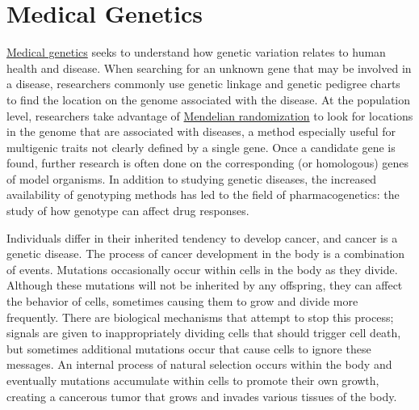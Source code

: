 \hypertarget{medical-genetics}{%
\section{Medical Genetics}\label{medical-genetics}}

\href{https://en.wikipedia.org/wiki/Medical_genetics}{Medical genetics} seeks to understand how genetic variation relates to human health and disease. When searching for an unknown gene that may be involved in a disease, researchers commonly use genetic linkage and genetic pedigree charts to find the location on the genome associated with the disease. At the population level, researchers take advantage of \href{https://en.wikipedia.org/wiki/Mendelian_randomization}{Mendelian randomization} to look for locations in the genome that are associated with diseases, a method especially useful for multigenic traits not clearly defined by a single gene. Once a candidate gene is found, further research is often done on the corresponding (or homologous) genes of model organisms. In addition to studying genetic diseases, the increased availability of genotyping methods has led to the field of pharmacogenetics: the study of how genotype can affect drug responses.

Individuals differ in their inherited tendency to develop cancer, and cancer is a genetic disease. The process of cancer development in the body is a combination of events. Mutations occasionally occur within cells in the body as they divide. Although these mutations will not be inherited by any offspring, they can affect the behavior of cells, sometimes causing them to grow and divide more frequently. There are biological mechanisms that attempt to stop this process; signals are given to inappropriately dividing cells that should trigger cell death, but sometimes additional mutations occur that cause cells to ignore these messages. An internal process of natural selection occurs within the body and eventually mutations accumulate within cells to promote their own growth, creating a cancerous tumor that grows and invades various tissues of the body.

